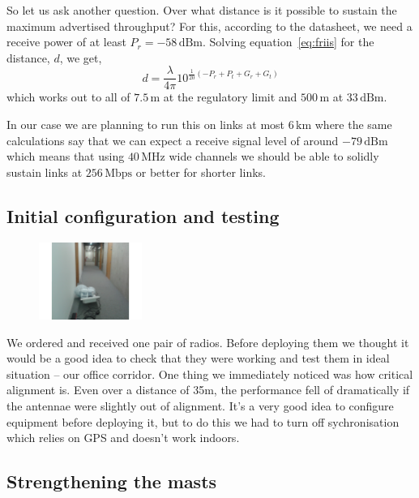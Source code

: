 So let us ask another question. Over what distance is it possible to
sustain the maximum advertised throughput? For this, according to the
datasheet, we need a receive power of at least $P_r =
-58\,\text{dBm}$. Solving equation~\ref{eq:friis} for the distance,
$d$, we get,
\begin{equation}
d = \frac{\lambda}{4\pi} 10^{\frac{1}{20}\left(-P_r + P_t + G_r + G_t\right)}
\end{equation}
which works out to all of $7.5\,\text{m}$ at the regulatory limit and
$500\,\text{m}$ at $33\,\text{dBm}$.

In our case we are planning to run this on links at most
$6\,\text{km}$ where the same calculations say that we can expect a
receive signal level of around $-79\,\text{dBm}$ which means that
using $40\,\text{MHz}$ wide channels we should be able to solidly
sustain links at $256\,\text{Mbps}$ or better for shorter links.

\subsection{Initial configuration and testing}
\label{december-2013-initial-configuration-and-testing}

\begin{figure}
\includegraphics[width=0.3\textwidth]{radio-in-corridor}
\end{figure}
We ordered and received one pair of radios. Before deploying them
we thought it would be a good idea to check that they were working
and test them in ideal situation -- our office corridor. One thing
we immediately noticed was how critical alignment is. Even over
a distance of 35m, the performance fell of dramatically if the
antennae were slightly out of alignment. It's a very good idea to
configure equipment before deploying it, but to do this we had to turn
off sychronisation which relies on GPS and doesn't work indoors.

\subsection{Strengthening the masts}
\label{december-2013-january-2014-strengthening-the-relays}

